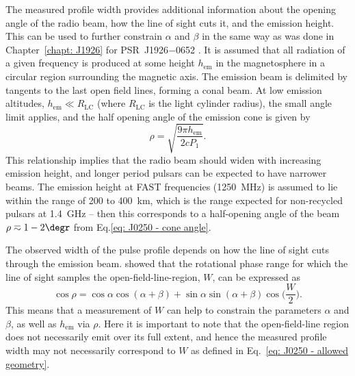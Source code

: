 The measured profile width provides additional information about the opening angle of the radio beam, how the line of sight cuts it, and the emission height. This can be used to further constrain $\alpha$ and $\beta$ in the same way as was done in Chapter~\ref{chapt: J1926} for PSR~J1926$-$0652 \citep[see also][]{RWJx2015a}. It is assumed that all radiation of a given frequency is produced at some height $h_\mathrm{em}$ in the magnetosphere in a circular region surrounding the magnetic axis. The emission beam is delimited by tangents to the last open field lines, forming a conal beam. At low emission altitudes, $h_\mathrm{em} \ll R_\mathrm{LC}$ (where $R_\mathrm{LC}$ is the light cylinder radius), the small angle limit applies, and the half opening angle of the emission cone is given by 
\begin{equation}
\label{eq: J0250 - cone angle}
    \rho = \sqrt{\frac{9\pi h_\mathrm{em}}{2cP_1}}.
\end{equation}
This relationship implies that the radio beam should widen with increasing emission height, and longer period pulsars can be expected to have narrower beams. The emission height at FAST frequencies (1250~MHz) is assumed to lie within the range of 200 to 400~km, which is the range expected for non-recycled pulsars at 1.4~GHz \citep[e.g.][]{MRxx2002, JKxx2019} -- then this corresponds to a half-opening angle of the beam $\rho \eqsim 1 - 2\degr$ from Eq.\eqref{eq: J0250 - cone angle}. 

The observed width of the pulse profile depends on how the line of sight cuts through the emission beam. \citet{GGRx1984} showed that the rotational phase range for which the line of sight samples the open-field-line-region, $W$, can be expressed as
\begin{equation}
\label{eq: J0250 - allowed geometry}
    \cos\rho = \cos\alpha\cos(\alpha+\beta)+\sin\alpha\sin(\alpha+\beta)\cos\bigg(\frac{W}{2}\bigg).
\end{equation}
This means that a measurement of $W$ can help to constrain the parameters $\alpha$ and $\beta$, as well as $h_\mathrm{em}$ via $\rho$. Here it is important to note that the open-field-line region does not necessarily emit over its full extent, and hence the measured profile width may not necessarily correspond to $W$ as defined in Eq.~\eqref{eq: J0250 - allowed geometry}.

